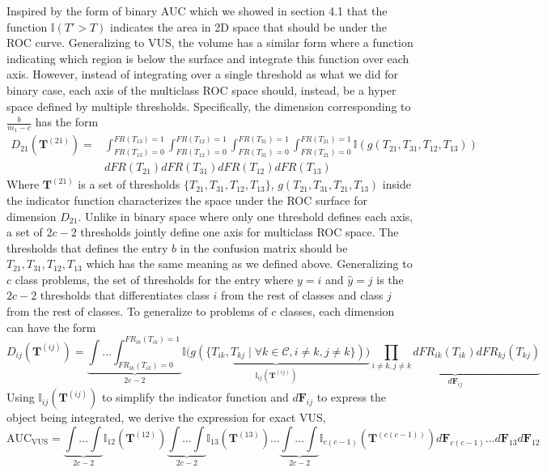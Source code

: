 \documentclass[twoside,11pt]{article}
\renewcommand{\>}{{\rightarrow}}
\renewcommand{\hat}{\widehat}
\newcommand{\1}{{\mathbf 1}}
\newcommand{\0}{{\mathbf 0}}
\begin{document}
Inspired by the form of binary AUC which we showed in section 4.1 that the function $\mathbb{I}(T'>T)$ indicates the area in 2D space that should be under the ROC curve. %
Generalizing to VUS, the volume has a similar form where a function indicating which region is below the surface and integrate this function over each axis. However, instead of integrating over a single threshold as what we did for binary case, each axis of the multiclass ROC space should, instead, be a hyper space defined by multiple thresholds. Specifically, the dimension corresponding to $\frac{b}{m_1-c}$ has the form 
\begin{align*}
    D_{21}(\textbf{T}^{(21)}) = & \int_{FR(T_{13})=0}^{FR(T_{13})=1}\int_{FR(T_{12})=0}^{FR(T_{12})=1}\int_{FR(T_{31})=0}^{FR(T_{31})=1}\int_{FR(T_{21})=0}^{FR(T_{21})=1}\mathbb{I}(g(T_{21}, T_{31}, T_{12}, T_{13}))\\
    & dFR(T_{21})dFR(T_{31})dFR(T_{12})dFR(T_{13})
\end{align*}
Where $\textbf{T}^{(21)}$ is a set of thresholds $\{T_{21}, T_{31}, T_{12}, T_{13}\}$, $g(T_{21}, T_{31}, T_{21}, T_{13})$ inside the indicator function characterizes the space under the ROC surface for dimension $D_{21}$. Unlike in binary space where only one threshold defines each axis, a set of $2c-2$ thresholds jointly define one axis for multiclass ROC space. The thresholds that defines the entry $b$ in the confusion matrix should be $T_{21}, T_{31}, T_{12}, T_{13}$ which has the same meaning as we defined above. Generalizing to $c$ class problems, the set of thresholds for the entry where $y=i$ and $\hat{y}=j$ is the $2c-2$ thresholds that differentiates class $i$ from the rest of classes and class $j$ from the rest of classes. To generalize to problems of $c$ classes, each dimension can have the form
\begin{equation}
    D_{ij}(\textbf{T}^{(ij)}) = \underbrace{\int\dots\int_{FR_{ik}(T_{ik}) = 0}^{FR_{ik}(T_{ik})=1}}_{2c-2}
\underbrace{\mathbb{I}\big(g(\{T_{ik}, T_{kj} \mid \forall k\in \mathcal{C}, i \neq k, j \neq k\})\big)}_{\mathbb{I}_{ij}(\textbf{T}^{(ij)})}
\underbrace{\prod_{i\neq k, j \neq k} d FR_{ik}(T_{ik})d FR_{kj}(T_{kj})}_{d\textbf{F}_{ij}}
\end{equation}
Using $\mathbb{I}_{ij}(\textbf{T}^{(ij)})$ to simplify the indicator function and $d\textbf{F}_{ij}$ to express the object being integrated, we derive the expression for exact VUS,
\begin{equation}
    \text{AUC}_{\text{VUS}} = \underbrace{\int\ldots\int}_{2c-2} \mathbb{I}_{12}(\textbf{T}^{(12)})\underbrace{\int\ldots\int}_{2c-2} \mathbb{I}_{13}(\textbf{T}^{(13)})\dots\underbrace{\int\ldots\int}_{2c-2} \mathbb{I}_{c(c-1)}(\textbf{T}^{(c(c-1))})d\textbf{F}_{c(c-1)}\dots d\textbf{F}_{13}d\textbf{F}_{12}
\end{equation}
\end{document}
